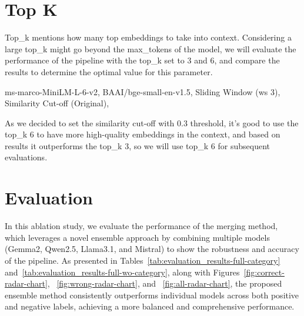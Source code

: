 \section{Top K}\label{sec:top-k}
Top\_k mentions how many top embeddings to take into context.
Considering a large top\_k might go beyond the max\_tokens of the model, we will evaluate the performance of the pipeline with the top\_k set to 3 and 6, and compare the results to determine the optimal value for this parameter.
\begin{table}[h!]
    \centering
    \noindent
    {\scriptsize ms-marco-MiniLM-L-6-v2, BAAI/bge-small-en-v1.5, Sliding Window (ws 3), Similarity Cut-off (Original),}
    \caption{Evaluation Results for Different Top\_k through the Pipeline (just with the Gemma2 model)}
    \label{tab:table_top_k}
\end{table}

As we decided to set the similarity cut-off with 0.3 threshold, it's good to use the top\_k 6 to have more high-quality embeddings in the context, and based on results it outperforms the top\_k 3, so we will use top\_k 6 for subsequent evaluations.

\section{Evaluation}\label{sec:evaluation-and-discussion}
In this ablation study, we evaluate the performance of the merging method, which leverages a novel ensemble approach by combining multiple models (Gemma2, Qwen2.5, Llama3.1, and Mistral) to show the robustness and accuracy of the pipeline.
As presented in Tables~\ref{tab:evaluation_results-full-category} and~\ref{tab:evaluation_results-full-wo-category}, along with Figures~\ref{fig:correct-radar-chart}, ~\ref{fig:wrong-radar-chart}, and ~\ref{fig:all-radar-chart}, the proposed ensemble method consistently outperforms individual models across both positive and negative labels, achieving a more balanced and comprehensive performance.

